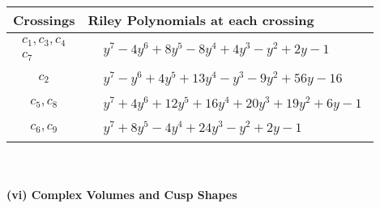 \documentclass[1p]{elsarticle_modified}
\theoremstyle{definition}
\begin{document}
\begin{tabular}{m{50pt}|m{274pt}}
Crossings & \hspace{64pt}Riley Polynomials at each crossing \\
\hline $$\begin{aligned}c_{1},c_{3},c_{4}\\c_{7}\end{aligned}$$&$\begin{aligned}
&y^7-4 y^6+8 y^5-8 y^4+4 y^3- y^2+2 y-1
\end{aligned}$\\
\hline $$\begin{aligned}c_{2}\end{aligned}$$&$\begin{aligned}
&y^7- y^6+4 y^5+13 y^4- y^3-9 y^2+56 y-16
\end{aligned}$\\
\hline $$\begin{aligned}c_{5},c_{8}\end{aligned}$$&$\begin{aligned}
&y^7+4 y^6+12 y^5+16 y^4+20 y^3+19 y^2+6 y-1
\end{aligned}$\\
\hline $$\begin{aligned}c_{6},c_{9}\end{aligned}$$&$\begin{aligned}
&y^7+8 y^5-4 y^4+24 y^3- y^2+2 y-1
\end{aligned}$\\
\hline
\end{tabular}\\~\\
\newpage\flushleft \textbf{(vi) Complex Volumes and Cusp Shapes}
\end{document}
